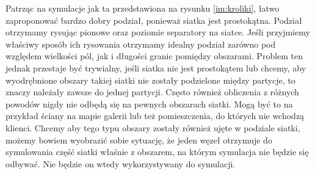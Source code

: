 Patrząc na symulacje jak ta przedstawiona na rysunku \ref{im:kroliki}, łatwo zaproponować bardzo dobry podział, ponieważ
siatka jest prostokątna.
Podział otrzymamy rysując pionowe oraz poziomie separatory na siatce.
Jeśli przyjmiemy właściwy sposób ich rysowania otrzymamy idealny podział zarówno pod względem wielkości pól, jak i
długości granic pomiędzy obszarami.
Problem ten jednak przestaje być trywialny, jeśli siatka nie jest prostokątem lub chcemy, aby wyodrębnione obszary takiej
siatki nie zostały podzielone między partycje, to znaczy należały zawsze do jednej partycji.
Często również obliczenia z różnych powodów nigdy nie odbędą się na pewnych obszarach siatki.
Mogą być to na przykład ściany na mapie galerii lub też pomieszczenia, do których nie wchodzą klienci.
Chcemy aby tego typu obszary zostały również ujęte w podziale siatki, możemy bowiem wyobrazić sobie sytuację, że
jeden węzeł otrzymuje do symulowania część siatki właśnie z obszarem, na którym symulacja nie będzie się odbywać.
Nie będzie on wtedy wykorzystywany do symulacji.

